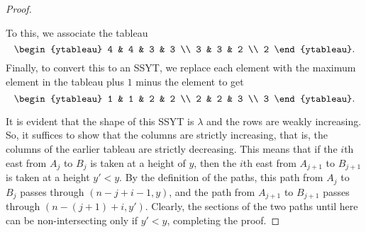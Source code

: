 \begin{proof}
\begin{fex}
			To this, we associate the tableau
			\[
			\begin{ytableau}
				4 & 4 & 3 & 3 \\
				3 & 3 & 2 \\
				2
			\end{ytableau}.
			\]
			Finally, to convert this to an SSYT, we replace each element with the maximum element in the tableau plus $1$ minus the element to get
			\[
			\begin{ytableau}
				1 & 1 & 2 & 2 \\
				2 & 2 & 3 \\
				3
			\end{ytableau}.
			\]
		\end{fex}
		It is evident that the shape of this SSYT is $\lambda$ and the rows are weakly increasing. So, it suffices to show that the columns are strictly increasing, that is, the columns of the earlier tableau are strictly decreasing. This means that if the $i$th east from $A_j$ to $B_j$ is taken at a height of $y$, then the $i$th east from $A_{j+1}$ to $B_{j+1}$ is taken at a height $y' < y$. By the definition of the paths, this path from $A_j$ to $B_j$ passes through $(n-j+i-1,y)$, and the path from $A_{j+1}$ to $B_{j+1}$ passes through $(n-(j+1)+i,y')$. Clearly, the sections of the two paths until here can be non-intersecting only if $y' < y$, completing the proof.
	\end{proof}


